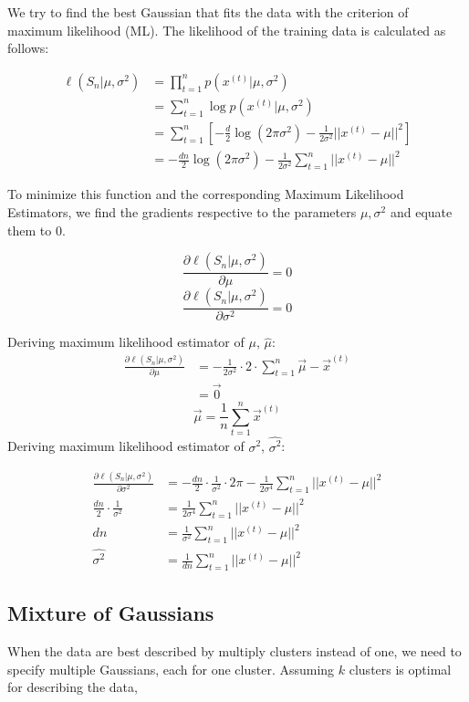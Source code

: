 \documentclass[a4paper]{article}
\begin{document}
We try to find the best Gaussian that fits the data with the criterion of maximum likelihood (ML). The likelihood of the training data is calculated as follows:

\begin{align*}
	\ell(S_n|\mu, \sigma^2) &= \prod_{t=1}^n p(x^{(t)}|\mu,\sigma^2)\\
	&= \sum_{t=1}^n \log p(x^{(t)} | \mu,\sigma^2)\\
	&= \sum_{t=1}^n [-\frac{d}{2}\log(2\pi\sigma^2) - \frac{1}{2\sigma^2}||x^{(t)} - \mu||^2]\\
	&= -\frac{dn}{2}\log(2\pi\sigma^2) - \frac{1}{2\sigma^2} \sum_{t=1}^n ||x^{(t)} - \mu||^2
\end{align*}

\noindent To minimize this function and the corresponding Maximum Likelihood Estimators, we find the gradients respective to the parameters $\mu, \sigma^2$ and equate them to 0.

$$ \frac{\partial\ell(S_n|\mu,\sigma^2)}{\partial\mu} = 0 $$ 
$$ \frac{\partial\ell(S_n|\mu,\sigma^2)}{\partial\sigma^2} = 0 $$

\noindent Deriving maximum likelihood estimator of $\mu$, $\hat{\mu}$:
\begin{align*}
	\frac{\partial\ell(S_n|\mu,\sigma^2)}{\partial\mu} &= -\frac{1}{2\sigma^2} \cdot 2 \cdot \sum_{t=1}^n \vec{\mu} - \vec{x}^{(t)}\\
	&= \vec{0} 
\end{align*}
$$ \vec{\mu} = \frac{1}{n}\sum_{t=1}^n \vec{x}^{(t)} $$
\newpage
\noindent Deriving maximum likelihood estimator of $\sigma^2$, $\hat{\sigma^2}$:

\begin{align*}
	\frac{\partial\ell(S_n|\mu,\sigma^2)}{\partial\sigma^2} &= -\frac{dn}{2}\cdot\frac{1}{\sigma^2}\cdot 2\pi - \frac{1}{2\sigma^4}\sum_{t=1}^n||x^{(t)} - \mu||^2\\
	\frac{dn}{2}\cdot\frac{1}{\sigma^2} &= \frac{1}{2\sigma^4}\sum_{t=1}^n||x^{(t)} - \mu||^2\\
	dn &= \frac{1}{\sigma^2}\sum_{t=1}^n||x^{(t)} - \mu||^2\\
	\hat{\sigma^2} &= \frac{1}{dn} \sum_{t=1}^n||x^{(t)} - \mu||^2
\end{align*}

\subsection{Mixture of Gaussians}
When the data are best described by multiply clusters instead of one, we need to specify multiple Gaussians, each for one cluster. Assuming $k$ clusters is optimal for describing the data,
\end{document}
